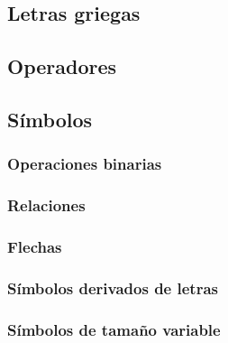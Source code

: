 \documentclass{article}
\numberwithin{equation}{section}
\DeclareMathOperator*{\limite}{límite}
\theoremstyle{plain}
\theoremstyle{definition}
\theoremstyle{remark}
\begin{document}
\subsection{Letras griegas}    



    
\subsection{Operadores}







\subsection{Símbolos}


\subsubsection{Operaciones binarias}


\subsubsection{Relaciones}



\subsubsection{Flechas}



\subsubsection{Símbolos derivados de letras}


\subsubsection{Símbolos de tamaño variable}
\end{document}
